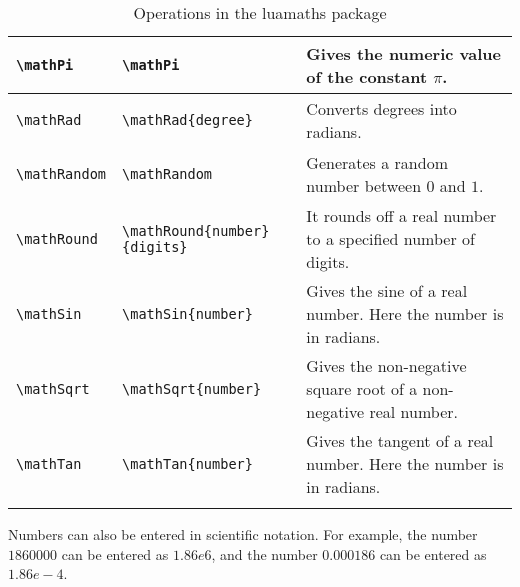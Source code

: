 \documentclass{article}
\begin{document}
\begin{center}
\begin{longtable}{llm{6cm}}
\midrule
\begin{lstlisting}
\mathPi
\end{lstlisting} &
\begin{lstlisting}
\mathPi
\end{lstlisting} & Gives the numeric value of the constant \(\pi \). \\
\midrule
\begin{lstlisting}
\mathRad
\end{lstlisting} &
\begin{lstlisting}
\mathRad{degree}
\end{lstlisting} & Converts degrees into radians. \\
\midrule
\begin{lstlisting}
\mathRandom
\end{lstlisting} & \begin{lstlisting}
\mathRandom
\end{lstlisting} & Generates a random number between \(0 \) and \(1 \). \\
\midrule
\begin{lstlisting}
\mathRound
\end{lstlisting} &
\begin{lstlisting}
\mathRound{number}{digits}
\end{lstlisting} & It rounds off a real number to a specified number of digits. \\
\midrule
\begin{lstlisting}
\mathSin
\end{lstlisting} &
\begin{lstlisting}
\mathSin{number}
\end{lstlisting} & Gives the sine of a real number. Here the number is in radians.\\
\midrule
\begin{lstlisting}
\mathSqrt
\end{lstlisting} &
\begin{lstlisting}
\mathSqrt{number}
\end{lstlisting} & Gives the non-negative square root of a non-negative real number.\\
\midrule
\begin{lstlisting}
\mathTan
\end{lstlisting} &
\begin{lstlisting}
\mathTan{number}
\end{lstlisting} & Gives the tangent of a real number. Here the number is in radians.\\
\bottomrule
\caption{Operations in the luamaths package}
\label{tbl:opluamaths}
\end{longtable}
\end{center}
Numbers can also be entered in scientific notation. For example, the number \(1860000\) can be entered as \(1.86e6\), and the number \(0.000186\) can be entered as \(1.86e-4\).
\end{document}
